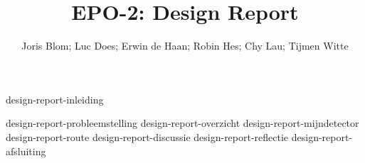 \documentclass{report}
\title{EPO-2: Design Report}
\author{Joris Blom; Luc Does; Erwin de Haan; Robin Hes; Chy Lau; Tijmen Witte}
\begin{document}
\maketitle
\newpage
{}

{design-report-inleiding}
\tableofcontents

\newpage
{}

{design-report-probleemstelling}
{design-report-overzicht}
{design-report-mijndetector}
{design-report-route}
{design-report-discussie}
{design-report-reflectie}
{design-report-afsluiting}

\newpage
{}

\printbibliography
\end{document}
